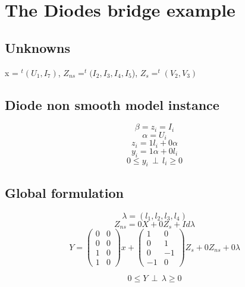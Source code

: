 \section{The Diodes bridge example}

\begin{figure}[h]
\centerline{
 \scalebox{0.7}{
    
 }
}\end{figure}




\subsection{Unknowns}

x = $^{t}(U_{1},I_{7})$,
$Z_{ns}=^{t}(I_{2},I_{3},I_{4},I_{5}$),
$Z_{s} = ^{t}(V_{2},V_{3})$
\subsection{Diode non smooth model instance}

\[ \beta = z_{i} = I_{i}\]
\[ \alpha =U_{i}\]
\[z_{i}=1l_{i}+0\alpha\]
\[y_{i}=1\alpha+0l_{i}\]
\[0 \leq y_{i} \, \perp \, l_{i} \geq 0\]


\subsection{Global formulation}

\[ \lambda =(l_{1},l_{2},l_{3},l_{4})\]
\[Z_{ns}=0X+0Z_{s}+Id\lambda\]
\[Y=\left(\begin{array}{cc}
0&0\\
0&0\\
1&0\\
1&0\end{array}\right) x+
\left(\begin{array}{cc}
1&0\\
0&1\\
0&-1\\
-1&0\end{array}
\right) Z_{s} + 0Z_{ns} +0\lambda\]

\[0 \leq Y \, \perp \, \lambda \geq 0\]



